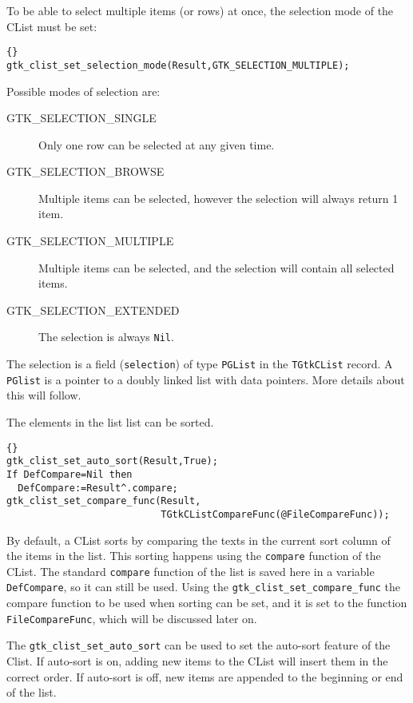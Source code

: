\documentclass[10pt]{article}
\begin{document}
To be able to select multiple items (or rows) at once, the selection mode of
the CList must be set: 
\begin{lstlisting}{}
gtk_clist_set_selection_mode(Result,GTK_SELECTION_MULTIPLE);
\end{lstlisting}
Possible modes of selection are:
\begin{description}
\item[GTK\_SELECTION\_SINGLE] Only one row can be selected at any given
time.
\item[GTK\_SELECTION\_BROWSE] Multiple items can be selected, however the
selection will always return 1 item.
\item[GTK\_SELECTION\_MULTIPLE] Multiple items can be selected, and the
selection will contain all selected items.
\item[GTK\_SELECTION\_EXTENDED] The selection is always \lstinline|Nil|.
\end{description}
The selection is a field (\lstinline|selection|) of type \lstinline|PGList| in the 
\lstinline|TGtkCList| record. A \lstinline|PGlist| is a pointer to a doubly linked 
list with data pointers. More details about this will follow.

The elements in the list list can be sorted. 
\begin{lstlisting}{}
gtk_clist_set_auto_sort(Result,True);
If DefCompare=Nil then
  DefCompare:=Result^.compare; 
gtk_clist_set_compare_func(Result,
                           TGtkCListCompareFunc(@FileCompareFunc));
\end{lstlisting}
By default, a CList sorts by comparing the texts in the current sort column 
of the items in the list. This sorting happens using the \lstinline|compare| 
function of the CList. The standard \lstinline|compare| function of the list 
is saved here in a variable \lstinline|DefCompare|, so it can still be used. 
Using the  \lstinline|gtk_clist_set_compare_func| the compare function to be 
used when sorting can be set, and it is set to the function 
\lstinline|FileCompareFunc|,  which will be discussed later on.

The \lstinline|gtk_clist_set_auto_sort| can be used to set the auto-sort
feature of the Clist. If auto-sort is on, adding new items to the CList will
insert them in the correct order. If auto-sort is off, new items are
appended to the beginning or end of the list.
\end{document}
